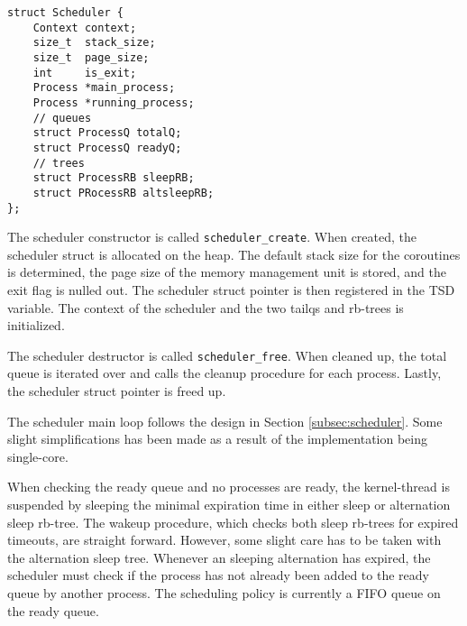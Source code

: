 \begin{lstlisting}[style={CustomC},caption={Scheduler struct type},label={lst:scheduler_struct_type}]
struct Scheduler {
    Context context;
    size_t  stack_size;
    size_t  page_size; 
    int     is_exit;
    Process *main_process;
    Process *running_process;
    // queues
    struct ProcessQ totalQ;
    struct ProcessQ readyQ;
    // trees
    struct ProcessRB sleepRB;
    struct PRocessRB altsleepRB;
};
\end{lstlisting}

%

The scheduler constructor is called \texttt{scheduler\_create}. When created, the scheduler struct is allocated on the heap. The default stack size for the coroutines is determined, the page size of the memory management unit is stored, and the exit flag is nulled out. The scheduler struct pointer is then registered in the TSD variable. The context of the scheduler and the two tailqs and rb\hyp{}trees is initialized.

The scheduler destructor is called \texttt{scheduler\_free}. When cleaned up, the total queue is iterated over and calls the cleanup procedure for each process. Lastly, the scheduler struct pointer is freed up. 

The scheduler main loop follows the design in Section \ref{subsec:scheduler}. Some slight simplifications has been made as a result of the implementation being single\hyp{}core. 

When checking the ready queue and no processes are ready, the kernel\hyp{}thread is suspended by sleeping the minimal expiration time in either sleep or alternation sleep rb\hyp{}tree. The wakeup procedure, which checks both sleep rb\hyp{}trees for expired timeouts, are straight forward. However, some slight care has to be taken with the alternation sleep tree. Whenever an sleeping alternation has expired, the scheduler must check if the process has not already been added to the ready queue by another process. The scheduling policy is currently a FIFO queue on the ready queue. 

